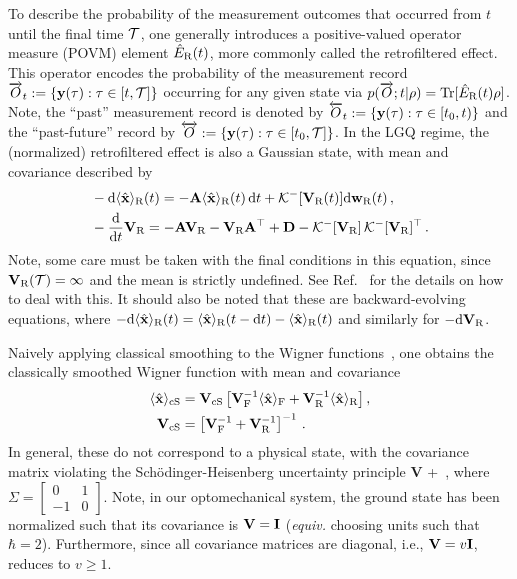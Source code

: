 \documentclass[./Main-revtex.tex]{subfiles}
\begin{document}
To describe the probability of the measurement outcomes that occurred from $t$ until the final time ${\cal T}$, one generally introduces a positive-valued operator measure (POVM) element $\hat{E}_{\text R}(t)$, more commonly called the retrofiltered effect. This operator encodes the probability of the measurement record $\overrightarrow{O}_t := \{{\bf y}(\tau):\tau\in[t,{\cal T}]\}$ occurring for any given state via $p(\overrightarrow{O};t|\rho) = {\rm Tr}[\hat{E}_{\text R}(t)\rho]$. Note, the ``past'' measurement record is denoted by $\overleftarrow{O}_t:=\{{\bf y}(\tau):\tau\in[t_0,t)\}$ and the ``past-future'' record by $\overleftrightarrow{O}:=\{{\bf y}(\tau):\tau\in[t_0,{\cal T}]\}$. In the LGQ regime, the (normalized) retrofiltered effect is also a Gaussian state, with mean and covariance described by \cite{ZhaMol17}
\begin{align}
    &-{\rm d}\langle\hat{\mathbf{x}}\rangle_{\text R}(t) = -\mathbf{A}\langle\hat{\mathbf{x}}\rangle_{\text R}(t)\,{\rm d} t+\mathcal{K}^{-}[\mathbf{V}_{\text R}(t)]{\rm d}\mathbf{w}_{\text R}(t)\,,
\label{1stmomentNREO}\\
    &-\dfrac{{\rm d}}{{\rm d} t} \mathbf{V}_{\text R}= -\mathbf{A}\mathbf{V}_{\text R} - \mathbf{V}_{\text R}\mathbf{A}^\top + \mathbf{D} - \mathcal{K}^{-}[\mathbf{V}_{\text R}]\,\mathcal{K}^{-}[\mathbf{V}_{\text R}]^\top\,.
\label{2ndmomentNREO}
\end{align}
Note, some care must be taken with the final conditions in this equation, since $\mathbf{V}_{\text R}({\cal T}) = \infty$ and the mean is strictly undefined. See Ref.~\cite{laverick2021quantum} for the details on how to deal with this. It should also be noted that these are backward-evolving equations, where $-{\rm d}\langle \hat{\bf x} \rangle_{\text R}(t) = \langle \hat{\bf x} \rangle_{\text R}(t - {\rm d} t) - \langle \hat{\bf x} \rangle_{\text R}(t)$ and similarly for $-{\rm d} {\mathbf{V}}_{\text R}$.

Naively applying classical smoothing to the Wigner functions~\cite{LCW25}, one obtains the classically smoothed Wigner function with mean and covariance
\begin{align}
\langle \hat{\bf x} \rangle_{\rm cS} &= {\bf V}_{\rm cS}\left[{\bf V}_{\text F}^{-1} \langle \hat{\bf x} \rangle_{\text F} + {\bf V}_{\text R}^{-1} \langle \hat{\bf x} \rangle_{\text R}\right],\\
{\bf V}_{\rm cS} &= \left[{\bf V}_{\text F}^{-1} + {\bf V}_{\text R}^{-1}\right]^{-1}\,.
\end{align}
In general, these do not correspond to a physical state, with the covariance matrix violating the Sch\"odinger-Heisenberg uncertainty principle \cite{laverick2019quantum}
\beq\label{SHUP}
{\bf V} + \Sigma {}\,,
\eeq
where $\Sigma =\left[\begin{smallmatrix}
0&1\\
-1&0
\end{smallmatrix}\right]$. Note, in our optomechanical system, the ground state has been normalized such that its covariance is ${\bf V} = {\bf I}$ ({\em equiv.} choosing units such that $\hbar = 2$). Furthermore, since all covariance matrices are diagonal, i.e., ${\bf V} = v{\bf I}$,  reduces to $v \geq 1$.
\end{document}
